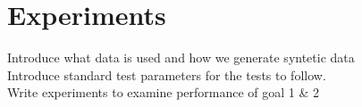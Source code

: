 \section{Experiments}

Introduce what data is used and how we generate syntetic data \\
Introduce standard test parameters for the tests to follow.\\
Write experiments to examine performance of goal 1 \& 2 